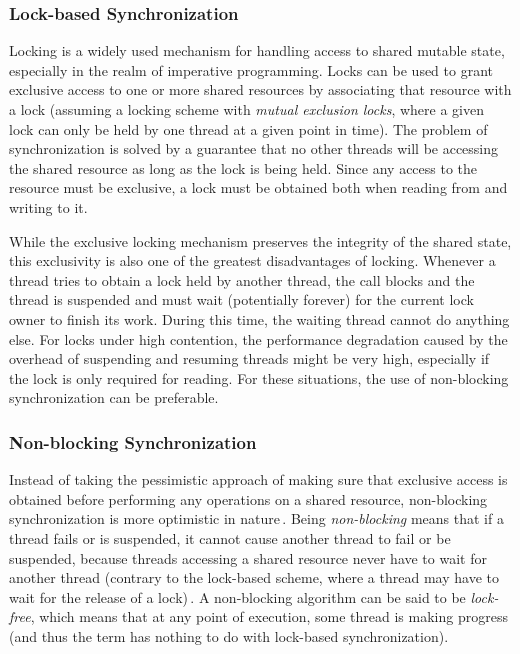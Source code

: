 \subsubsection{Lock-based Synchronization}
Locking is a widely used mechanism for handling access to shared mutable state, especially in the realm of imperative programming. Locks can be used to grant exclusive access to one or more shared resources by associating that resource with a lock (assuming a locking scheme with \emph{mutual exclusion locks}, where a given lock can only be held by one thread at a given point in time). The problem of synchronization is solved by a guarantee that no other threads will be accessing the shared resource as long as the lock is being held. Since any access to the resource must be exclusive, a lock must be obtained both when reading from and writing to it. 

While the exclusive locking mechanism preserves the integrity of the shared state, this exclusivity is also one of the greatest disadvantages of locking. Whenever a thread tries to obtain a lock held by another thread, the call blocks and the thread is suspended and must wait (potentially forever) for the current lock owner to finish its work. During this time, the waiting thread cannot do anything else. For locks under high contention, the performance degradation caused by the overhead of suspending and resuming threads might be very high, especially if the lock is only required for reading. For these situations, the use of non-blocking synchronization can be preferable.


\subsubsection{Non-blocking Synchronization}
Instead of taking the pessimistic approach of making sure that exclusive access is obtained before performing any operations on a shared resource, non-blocking synchronization is more optimistic in nature\,\citep{Goetz2006}. Being \emph{non-blocking} means that if a thread fails or is suspended, it cannot cause another thread to fail or be suspended, because threads accessing a shared resource never have to wait for another thread (contrary to the lock-based scheme, where a thread may have to wait for the release of a lock)\,\citep{Goetz2006}. A non-blocking algorithm can be said to be \emph{lock-free}, which means that at any point of execution, some thread is making progress (and thus the term has nothing to do with lock-based synchronization).

